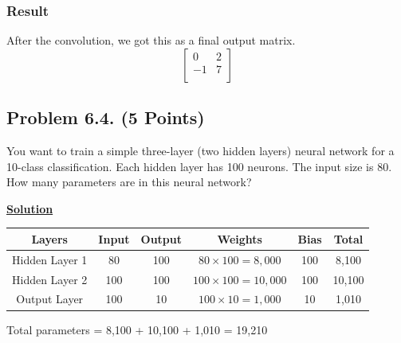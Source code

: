 \documentclass[12pt, a4paper]{article}
\begin{document}
                \subsubsection{Result}
                    After the convolution, we got this as a final output matrix.
                    $$
                        \begin{bmatrix}
                            0 & 2 \\
                            -1 & 7 \\
                        \end{bmatrix}
                    $$

        \subsection{Problem 6.4. (5 Points)}
            You want to train a simple three-layer (two hidden layers) neural network for a 10-class classification.
            Each hidden layer has 100 neurons. The input size is 80. How many parameters are in this neural network?

            \vspace{1em}

            \noindent \underline{\textbf{Solution}}

            \vspace{0.25em}

            \begin{table}[h]
                \centering
                \begin{tabular}{|c|c|c|c|c|c|}
                    \hline
                    \textbf{Layers} & \textbf{Input} & \textbf{Output} & \textbf{Weights} & \textbf{Bias} & \textbf{Total} \\
                    \hline \hline
                    Hidden Layer 1 & 80 & 100 & $80 \times 100 = 8,000$ & 100 & 8,100 \\
                    \hline
                    Hidden Layer 2 & 100 & 100 & $100 \times 100 = 10,000$ & 100 & 10,100 \\
                    \hline
                    Output Layer & 100 & 10 & $100 \times 10 = 1,000$ & 10 & 1,010 \\
                    \hline
                \end{tabular}
            \end{table}
            \noindent Total parameters = 8,100 + 10,100 + 1,010 = 19,210

			\vspace{1em}
\end{document}
